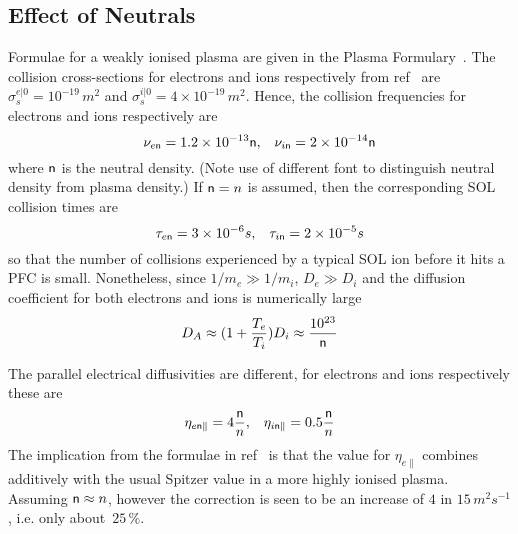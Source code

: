 \subsection{Effect of Neutrals}\label{sec:neuts}
Formulae for a weakly ionised plasma are given in the Plasma Formulary~\cite{NRLpf07}.
The collision cross-sections for electrons and ions respectively from
ref~\cite{Ha91hydr} are $\sigma_s^{e|0}= 10^{-19}$\,$m^2$ and
$\sigma_s^{i|0}= 4 \times 10^{-19}$\,$m^2$.
Hence, the collision frequencies for electrons and ions respectively are
\begin{equation}
\nu_{e{\sf n}}= 1.2 \times 10^{-13} {\sf n},\;\;\; \nu_{i{\sf n}}= 2 \times 10^{-14} {\sf n}
\end{equation}
where ${\sf n}$ is the neutral density.
(Note use of different font to distinguish neutral density from plasma density.)
If ${\sf n}=n$ is assumed, then
the corresponding SOL collision times are
\begin{equation}
\tau_{e{\sf n}}= 3 \times 10^{-6} s,\;\;\; \tau_{i{\sf n}}= 2 \times 10^{-5} s
\end{equation}
so that the number of collisions experienced by a typical SOL ion
before it hits a PFC is small.
Nonetheless, since $1/m_e \gg 1/m_i$, $D_e \gg D_i$ and the
diffusion coefficient for both electrons and ions is numerically large
\begin{equation}
D_A \approx (1+\frac{T_e}{T_i}) D_i \approx \frac{10^{23}}{{\sf n}}
\end{equation}

The parallel electrical diffusivities are different,
for electrons and ions respectively these are
\begin{equation}
\eta_{e {\sf n}\parallel} =4 \frac{{\sf n}}{n},\;\;\;
\eta_{i {\sf n}\parallel} =0.5 \frac{{\sf n}}{n}
\end{equation}
The implication from the formulae in ref~\cite{Le06emer} is that 
the value for $\eta_{e \parallel}$ combines additively with the usual
Spitzer value in a more
highly ionised plasma. Assuming ${\sf n} \approx n$, however the correction
is seen to be an increase of $4$ in $15$\,$m^2s^{-1}$, i.e. only about~$25$\,\%.

